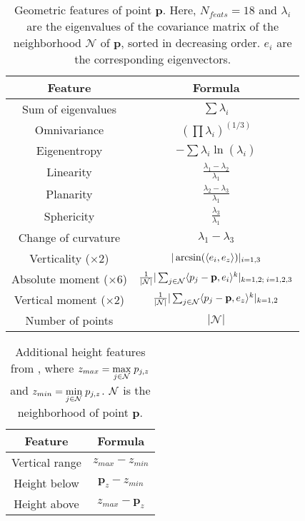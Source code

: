 \documentclass{article}
\begin{document}
\begin{table}[H]
    \centering
    \begin{tabular}{|c||c|}
    \hline
    \textbf{Feature} & \textbf{Formula} \\
    \hline   
    Sum of eigenvalues & $\sum \lambda_i$ \\[1ex]
    Omnivariance & $(\prod \lambda_i)^{(1/3)}$\\[1ex]
    Eigenentropy & $-\sum \lambda_i \ln(\lambda_i)$\\[1ex]
    Linearity & $\frac{\lambda_1 - \lambda_2}{\lambda_1}$\\[1ex]
    Planarity & $\frac{\lambda_2 - \lambda_3}{\lambda_1}$\\[1ex]
    Sphericity & $\frac{\lambda_3}{\lambda_1}$\\[1ex]
    Change of curvature & $\lambda_1 - \lambda_3$\\[1ex]
    Verticality ($\times2$) & $|\arcsin(\langle e_i, e_z \rangle)|_{i=1, 3}$ \\[1ex]
    Absolute moment ($\times6$) & $\frac{1}{|\mathcal{N}|}|\sum_{j\in\mathcal{N}} \langle p_j - \mathbf{p}, e_i \rangle^k|_{k = 1, 2;\; i = 1, 2, 3}$\\[1ex]
    Vertical moment ($\times2$) & $\frac{1}{|\mathcal{N}|}|\sum_{j\in\mathcal{N}} \langle p_j - \mathbf{p}, e_z \rangle^k|_{k=1, 2}$ \\[1ex]
    Number of points & $|\mathcal{N}|$\\[1ex]
    \hline
    \end{tabular}
    \caption{Geometric features \cite{thomas_semantic_2018} of point $\mathbf{p}$. Here, $N_{feats}=18$ and $\lambda_i$ are the eigenvalues of the covariance matrix of the neighborhood $\mathcal{N}$ of $\mathbf{p}$, sorted in decreasing order. $e_i$ are the corresponding eigenvectors.}
    \label{tab:thomas_feat}
\end{table}

\begin{table}[H]
    \centering
    \begin{tabular}{|c||c|}
        \hline
    \textbf{Feature} & \textbf{Formula} \\
        \hline
        Vertical range & $z_{max} - z_{min} $\\[1ex]
        Height below & $\mathbf{p}_z - z_{min} $ \\[1ex]
        Height above & $z_{max} - \mathbf{p}_z$\\[1ex]
        \hline
    \end{tabular}

    \caption{Additional height features from \cite{hackel_fast_nodate, mohamed_improvement_2022}, where $z_{max} = \underset{j\in\mathcal{N}}{\max}\;p_{j,z}$ and $z_{min} = \underset{j\in\mathcal{N}}{\min}\; p_{j,z}$. $\mathcal{N}$ is the neighborhood of point $\mathbf{p}$.}
    \label{tab:height_feat}
\end{table}
\end{document}
